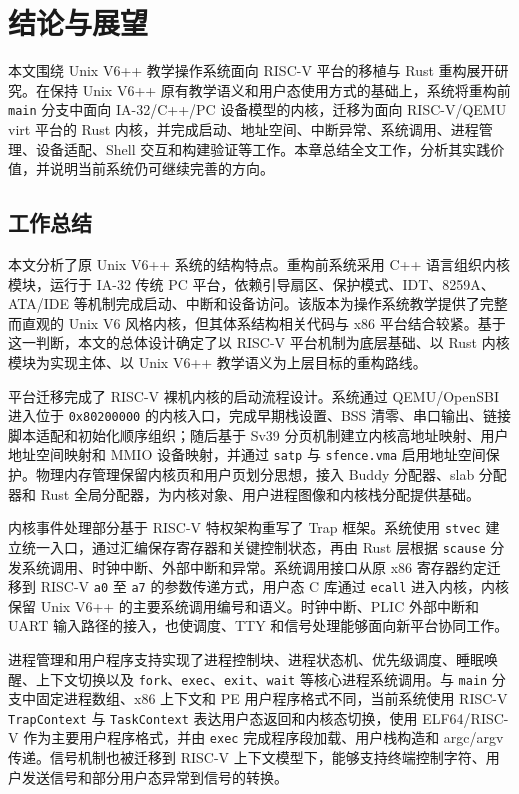 \chapter{结论与展望}\label{chap:conclusion-outlook}

本文围绕 Unix V6++ 教学操作系统面向 RISC-V 平台的移植与 Rust 重构展开研究。在保持 Unix V6++ 原有教学语义和用户态使用方式的基础上，系统将重构前 \verb|main| 分支中面向 IA-32/C++/PC 设备模型的内核，迁移为面向 RISC-V/QEMU virt 平台的 Rust 内核，并完成启动、地址空间、中断异常、系统调用、进程管理、设备适配、Shell 交互和构建验证等工作。本章总结全文工作，分析其实践价值，并说明当前系统仍可继续完善的方向。

\section{工作总结}

本文分析了原 Unix V6++ 系统的结构特点。重构前系统采用 C++ 语言组织内核模块，运行于 IA-32 传统 PC 平台，依赖引导扇区、保护模式、IDT、8259A、ATA/IDE 等机制完成启动、中断和设备访问。该版本为操作系统教学提供了完整而直观的 Unix V6 风格内核，但其体系结构相关代码与 x86 平台结合较紧。基于这一判断，本文的总体设计确定了以 RISC-V 平台机制为底层基础、以 Rust 内核模块为实现主体、以 Unix V6++ 教学语义为上层目标的重构路线。

平台迁移完成了 RISC-V 裸机内核的启动流程设计。系统通过 QEMU/OpenSBI 进入位于 \verb|0x80200000| 的内核入口，完成早期栈设置、BSS 清零、串口输出、链接脚本适配和初始化顺序组织；随后基于 Sv39 分页机制建立内核高地址映射、用户地址空间映射和 MMIO 设备映射，并通过 \verb|satp| 与 \verb|sfence.vma| 启用地址空间保护。物理内存管理保留内核页和用户页划分思想，接入 Buddy 分配器、slab 分配器和 Rust 全局分配器，为内核对象、用户进程图像和内核栈分配提供基础。

内核事件处理部分基于 RISC-V 特权架构重写了 Trap 框架。系统使用 \verb|stvec| 建立统一入口，通过汇编保存寄存器和关键控制状态，再由 Rust 层根据 \verb|scause| 分发系统调用、时钟中断、外部中断和异常。系统调用接口从原 x86 寄存器约定迁移到 RISC-V \verb|a0| 至 \verb|a7| 的参数传递方式，用户态 C 库通过 \verb|ecall| 进入内核，内核保留 Unix V6++ 的主要系统调用编号和语义。时钟中断、PLIC 外部中断和 UART 输入路径的接入，也使调度、TTY 和信号处理能够面向新平台协同工作。

进程管理和用户程序支持实现了进程控制块、进程状态机、优先级调度、睡眠唤醒、上下文切换以及 \verb|fork|、\verb|exec|、\verb|exit|、\verb|wait| 等核心进程系统调用。与 \verb|main| 分支中固定进程数组、x86 上下文和 PE 用户程序格式不同，当前系统使用 RISC-V \verb|TrapContext| 与 \verb|TaskContext| 表达用户态返回和内核态切换，使用 ELF64/RISC-V 作为主要用户程序格式，并由 \verb|exec| 完成程序段加载、用户栈构造和 argc/argv 传递。信号机制也被迁移到 RISC-V 上下文模型下，能够支持终端控制字符、用户发送信号和部分用户态异常到信号的转换。

